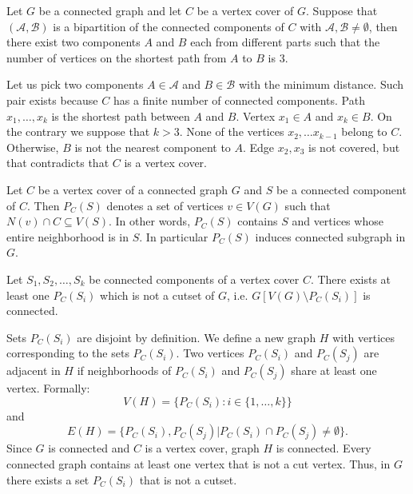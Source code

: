 \begin{lemma}
Let \(G\) be a connected graph and let \(C\) be a vertex cover of \(G\). 
Suppose	that \((\mathcal{A}, \mathcal{B})\) is a bipartition of the connected components of \(C\) with \(\mathcal{A}, \mathcal{B} \neq \emptyset\), then there
exist two components \(A\) and \(B\) each from different parts such that the number of vertices on the shortest path from \(A\) to \(B\) is 3.
\end{lemma}

\begin{myproof}
	Let us pick two components \(A \in \mathcal{A}\) and \(B \in \mathcal{B}\) with the minimum distance. 
	Such pair exists because \(C\) has a finite number of connected components.
	Path \(x_1, \dots, x_k\) is the shortest path between \(A\) and \(B\). Vertex \(x_1 \in A\) and \(x_k \in B\).
	On the contrary we suppose that \(k > 3\). 
	None of the vertices \(x_2, \dots x_{k-1}\) belong to \(C\). Otherwise, \(B\) is not the nearest component to \(A\).
	Edge \(x_2, x_3\) is not covered, but that contradicts that \(C\) is a vertex cover.
\end{myproof}

Let \(C\) be a vertex cover of a connected graph \(G\) and \(S\) be a connected component of \(C\).
Then \(P_C(S)\) denotes a set of vertices \(v \in V(G)\) such that \(N(v) \cap C \subseteq V(S)\).
In other words, \(P_C(S)\) contains \(S\) and vertices whose entire neighborhood is in \(S\).
In particular \(P_C(S)\) induces connected subgraph in \(G\).
\begin{lemma}
Let \(S_1, S_2, \dots, S_k\) be connected components of a
vertex cover \(C\). There exists at least one \(P_C(S_i)\) which is not a cutset of \(G\), i.e.
\(G[V(G) \setminus P_C(S_i)]\) is connected.
\end{lemma}

\begin{myproof}
	Sets \(P_C(S_i)\) are disjoint by definition.
	We define a new graph \(H\) with vertices corresponding to the sets \(P_C(S_i)\).
	Two vertices \(P_C(S_i)\) and \(P_C(S_j)\) are adjacent in \(H\) if neighborhoods of \(P_C(S_i)\) and \(P_C(S_j)\) 
	share at least one vertex.
	Formally:
	 \[V(H) = \{P_C(S_i): i \in \{1, \dots, k\}\}\]
	 and
	 \[E(H) = \{P_C(S_i), P_C(S_j)|  P_C(S_i) \cap P_C(S_j) \neq \emptyset\}.\]
	Since \(G\) is connected and \(C\) is a vertex cover, graph \(H\) is connected.
	Every connected graph contains at least one vertex that is not a cut vertex.
	Thus, in \(G\) there exists a set \(P_C(S_i)\) that is not a cutset. 
\end{myproof}

